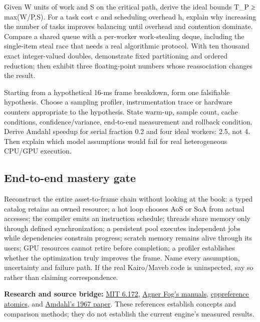 Given W units of work and S on the critical path, derive the ideal bounds T\_P ≥ max(W/P,S). For a task cost c and scheduling overhead h, explain why increasing the number of tasks improves balancing until overhead and contention dominate. Compare a shared queue with a per-worker work-stealing deque, including the single-item steal race that needs a real algorithmic protocol. With ten thousand exact integer-valued doubles, demonstrate fixed partitioning and ordered reduction; then exhibit three floating-point numbers whose reassociation changes the result.

Starting from a hypothetical 16-ms frame breakdown, form one falsifiable hypothesis. Choose a sampling profiler, instrumentation trace or hardware counters appropriate to the hypothesis. State warm-up, sample count, cache conditions, confidence/variance, end-to-end measurement and rollback condition. Derive Amdahl speedup for serial fraction 0.2 and four ideal workers: 2.5, not 4. Then explain which model assumptions would fail for real heterogeneous CPU/GPU execution.

\subsection{End-to-end mastery gate}\label{end-to-end-mastery-gate}

Reconstruct the entire asset-to-frame chain without looking at the book: a typed catalog retains an owned resource; a hot loop chooses AoS or SoA from actual accesses; the compiler emits an instruction schedule; threads share memory only through defined synchronization; a persistent pool executes independent jobs while dependencies constrain progress; scratch memory remains alive through its users; GPU resources cannot retire before completion; a profiler establishes whether the optimization truly improves the frame. Name every assumption, uncertainty and failure path. If the real Kairo/Maveb code is uninspected, say so rather than claiming correspondence.

\textbf{Research and source bridge:} \href{https://ocw.mit.edu/courses/6-172-performance-engineering-of-software-systems-fall-2018/video_galleries/lecture-videos/}{MIT 6.172}, \href{https://www.agner.org/optimize/}{Agner Fog's manuals}, \href{https://en.cppreference.com/w/cpp/atomic/memory_order}{cppreference atomics}, and \href{https://doi.org/10.1145/1465482.1465560}{Amdahl's 1967 paper}. These references establish concepts and comparison methods; they do not establish the current engine's measured results.


